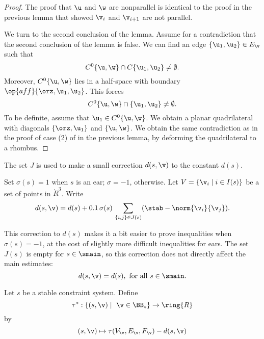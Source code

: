 \begin{proof} 
The proof that $\u$ and $\w$ are nonparallel is identical to the
proof in the previous lemma that showed $\v_i$ and $\v_{i+1}$ are not parallel.

We turn to the second conclusion of the lemma.
Assume for a contradiction that the second conclusion of the lemma is false.
We can find an edge $\{\u_1,\u_2\}\in E_\v$ such that 
\[
C^0\{\u,\w\}\cap C\{\u_1,\u_2\}\ne \emptyset.
\]
Moreover, $C^0\{\u,\w\}$ lies in a half-space with boundary
$\op{aff}\{\orz,\u_1,\u_2\}$.  This forces 
\[
C^0\{\u,\w\}\cap \{\u_1,\u_2\}\ne \emptyset.
\]
To be definite, assume that $\u_1\in C^0\{\u,\w\}$.  
We obtain a planar quadrilateral with diagonals
$\{\orz,\u_1\}$ and $\{\u,\w\}$.  We obtain the same contradiction
as in the proof of case (2) of  in the previous lemma,
by deforming the quadrilateral to a rhombus.
\end{proof}

The set $J$ is used to make a small correction $d(s,\v)$ to the
constant $d(s)$.  


\begin{definition}[$d(s,\v)$]
Set $\sigma(s) =1$ when $s$ is an ear;  $\sigma =
-1$, otherwise.  Let $V=\{\v_i\mid i\in I(s)\}$ 
be a set of points in $\ring{R}^3$.
Write
\begin{equation}
d(s,\v) = d(s) +  0.1\, \sigma(s)\,\sum_{\{i,j\}\in J(s)} (\stab - \norm{\v_i}{\v_j}).
\end{equation}
\end{definition}
%
%

This correction to $d(s)$  makes it a bit easier to prove inequalities when
$\sigma(s)=-1$, at the cost of slightly more difficult inequalities for ears.
The set $J(s)$ is empty for $s\in \smain$, so this correction does not
directly affect the main estimates:
\[
d(s,\v) = d(s), \text{ for all } s \in \smain.
\]


\begin{definition}[$\tau^*$]\label{def:tau-star}
%
Let $s$ be a stable constraint system.  Define 
\[
\tau^*:\{(s,\v)\mid \ \v\in \BB_s\} \to \ring{R}
\] 
by
\[ 
(s,\v) \mapsto \tau(V_\v,E_\v,F_\v)-d(s,\v)
\] 
%
\end{definition}

